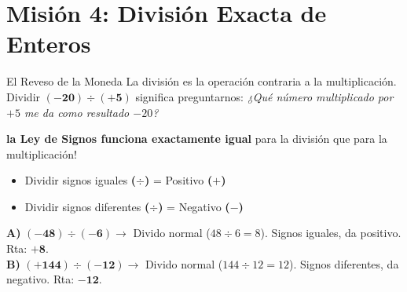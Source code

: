 \documentclass[12pt, letterpaper]{article}
\begin{document}
	\section*{Misión 4: División Exacta de Enteros}
	
	\begin{concepto}{El Reveso de la Moneda}
		La división es la operación contraria a la multiplicación. Dividir $\mathbf{(-20) \div (+5)}$ significa preguntarnos: \textit{¿Qué número multiplicado por $+5$ me da como resultado $-20$?}
		
		\textbf{la Ley de Signos funciona exactamente igual} para la división que para la multiplicación!
		\begin{itemize}
			\item Dividir signos iguales \textbf{($\div$)} = Positivo \textbf{($+$)}
			\item Dividir signos diferentes \textbf{($\div$)} = Negativo \textbf{($-$)}
		\end{itemize}
	\end{concepto}
	
	\begin{ejemplo}
		\textbf{A)} $\mathbf{(-48) \div (-6)} \rightarrow$ Divido normal ($48 \div 6 = 8$). Signos iguales, da positivo. Rta: $\mathbf{+8}$.\\
		\textbf{B)} $\mathbf{(+144) \div (-12)} \rightarrow$ Divido normal ($144 \div 12 = 12$). Signos diferentes, da negativo. Rta: $\mathbf{-12}$.
	\end{ejemplo}
	
\end{document}
